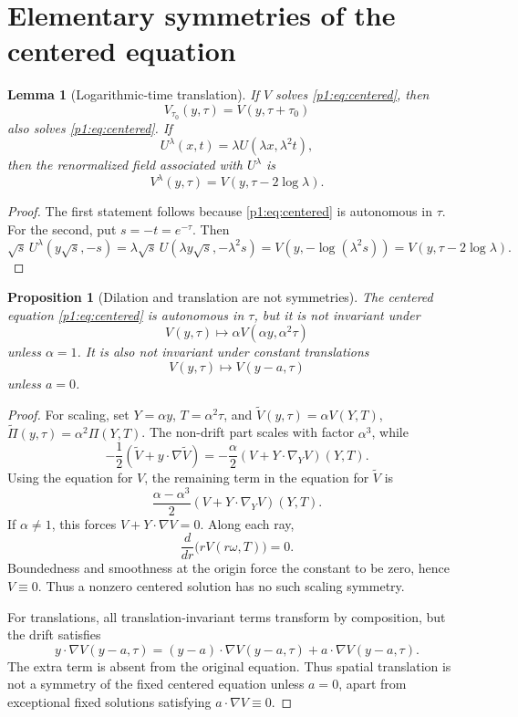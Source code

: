 \documentclass[11pt]{amsart}
\theoremstyle{plain}
\newtheorem{lemma}[lemma]{Lemma}
\newtheorem{proposition}[proposition]{Proposition}
\theoremstyle{definition}
\theoremstyle{remark}
\numberwithin{equation}{section}
\begin{document}
\section{Elementary symmetries of the centered equation}
\label{p1:app:centered-symmetries}

\begin{lemma}[Logarithmic-time translation]\label{p1:lem:tau-translation}
If \(V\) solves \eqref{p1:eq:centered}, then
\[
   V_{\tau_0}(y,\tau)=V(y,\tau+\tau_0)
\]
also solves \eqref{p1:eq:centered}.  If
\[
   U^\lambda(x,t)=\lambda U(\lambda x,\lambda^2t),
\]
then the renormalized field associated with \(U^\lambda\) is
\[
   V^\lambda(y,\tau)=V(y,\tau-2\log\lambda).
\]
\end{lemma}

\begin{proof}
The first statement follows because \eqref{p1:eq:centered} is autonomous in
\(\tau\).  For the second, put \(s=-t=e^{-\tau}\).  Then
\[
   \sqrt{s}\,U^\lambda(y\sqrt{s},-s)
   =
   \lambda\sqrt{s}\,U(\lambda y\sqrt{s},-\lambda^2s)
   =
   V(y,-\log(\lambda^2s))
   =
   V(y,\tau-2\log\lambda).
\]
\end{proof}

\begin{proposition}[Dilation and translation are not symmetries]
\label{p1:prop:no-cascade}
The centered equation \eqref{p1:eq:centered} is autonomous in \(\tau\), but it is
not invariant under
\[
   V(y,\tau)\mapsto \alpha V(\alpha y,\alpha^2\tau)
\]
unless \(\alpha=1\).  It is also not invariant under constant translations
\[
   V(y,\tau)\mapsto V(y-a,\tau)
\]
unless \(a=0\).
\end{proposition}

\begin{proof}
For scaling, set \(Y=\alpha y\), \(T=\alpha^2\tau\), and
\(\widetilde V(y,\tau)=\alpha V(Y,T)\),
\(\widetilde\Pi(y,\tau)=\alpha^2\Pi(Y,T)\).  The non-drift part scales with
factor \(\alpha^3\), while
\[
   -\frac12(\widetilde V+y\cdot\nabla\widetilde V)
   =
   -\frac{\alpha}{2}(V+Y\cdot\nabla_YV)(Y,T).
\]
Using the equation for \(V\), the remaining term in the equation for \(\widetilde V\) is
\[
   \frac{\alpha-\alpha^3}{2}(V+Y\cdot\nabla_YV)(Y,T).
\]
If \(\alpha\ne1\), this forces \(V+Y\cdot\nabla V=0\).  Along each ray,
\[
   \frac{d}{dr}\bigl(rV(r\omega,T)\bigr)=0.
\]
Boundedness and smoothness at the origin force the constant to be zero, hence
\(V\equiv0\).  Thus a nonzero centered solution has no such scaling symmetry.

For translations, all translation-invariant terms transform by composition,
but the drift satisfies
\[
   y\cdot\nabla V(y-a,\tau)
   =
   (y-a)\cdot\nabla V(y-a,\tau)+a\cdot\nabla V(y-a,\tau).
\]
The extra term is absent from the original equation.  Thus spatial
translation is not a symmetry of the fixed centered equation unless \(a=0\),
apart from exceptional fixed solutions satisfying \(a\cdot\nabla V\equiv0\).
\end{proof}
\end{document}
